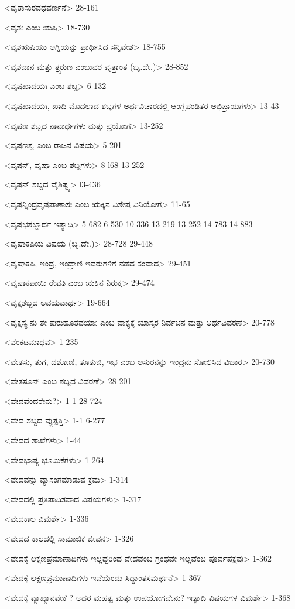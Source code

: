 <ವೃತಾಸುರವಧವರ್ಣನೆ>
28-161

<ವೃಶಃ ಎಂಬ ಋಷಿ>
18-730

<ವೃಶಋಷಿಯು ಅಗ್ನಿಯನ್ನು ಪ್ರಾರ್ಥಿಸಿದ ಸನ್ನಿವೇಶ>
18-755

<ವೃಶಜಾನ ಮತ್ತು ತ್ರ್ಯರುಣ ಎಂಬುವರ ವೃತ್ತಾಂತ (ಬೃ.ದೇ.)>
28-852

<ವೃಷಖಾದಯಃ ಎಂಬ ಶಬ್ದ>
6-132

<ವೃಷಖಾದಯಃ, ಖಾದಿ ಮೊದಲಾದ ಶಬ್ದಗಳ ಅರ್ಥವಿಚಾರದಲ್ಲಿ ಆಂಗ್ಲಪಂಡಿತರ ಅಭಿಪ್ರಾಯಗಳು>
13-43

<ವೃಷಣ ಶಬ್ದದ ನಾನಾರ್ಥಗಳು ಮತ್ತು ಪ್ರಯೋಗ>
13-252

<ವೃಷಣಶ್ವ ಎಂಬ ರಾಜನ ವಿಷಯ>
5-201

<ವೃಷನ್‍, ವೃಷಾ ಎಂಬ ಶಬ್ದಗಳು>
8-l68
13-252

<ವೃಷನ್‍ ಶಬ್ದದ ವೈಶಿಷ್ಟ್ಯ>
l3-436

<ವೃಷನ್ನಿಂದ್ರವೃಷಪಾಣಾಸಃ ಎಂಬ ಋಕ್ಕಿನ ವಿಶೇಷ ವಿನಿಯೋಗ>
11-65

<ವೃಷಭಶಬ್ದಾರ್ಥ ಇತ್ಯಾದಿ>
5-682
6-530 
10-336 
13-219 
13-252
14-783
14-883

<ವೃಷಾಕಪಿಯ ವಿಷಯ (ಬೃ.ದೇ.)>
28-728
29-448

<ವೃಷಾಕಪಿ, ಇಂದ್ರ, ಇಂದ್ರಾಣಿ ಇವರುಗಳಿಗೆ ನಡೆದ ಸಂವಾದ>
29-451

<ವೃಷಾಕಪಾಯಿ ರೇವತಿ ಎಂಬ ಋಕ್ಕಿನ ನಿರುಕ್ತ>
29-474

<ವೃಕ್ಷಶಬ್ದದ ಅವಯವಾರ್ಥ>
19-664

<ವೃಕ್ಷಸ್ಯ ನು ತೇ ಪುರುಹೂತವಯಾಃ ಎಂಬ ವಾಕ್ಯಕ್ಕೆ ಯಾಸ್ಕರ ನಿರ್ವಚನ ಮತ್ತು ಅರ್ಥವಿವರಣೆ>
20-778

<ವೆಂಕಟಮಾಧವ>
1-235

<ವೇತಸು, ತುಗ, ದಶೋಣಿ, ತೂತುಜಿ, ಇಭ ಎಂಬ ಅಸುರನನ್ನು ಇಂದ್ರನು ಸೋಲಿಸಿದ ವಿಚಾರ>
20-730

<ವೇತಸೂನ್‍ ಎಂಬ ಶಬ್ದದ ವಿವರಣೆ>
28-201

<ವೇದವೆಂದರೇನು?>
1-1
28-724

<ವೇದ ಶಬ್ದದ ವ್ಯುತ್ಪತ್ತಿ>
1-1
6-277

<ವೇದದ ಶಾಖೆಗಳು>
1-44

<ವೇದಭಾಷ್ಯ ಭೂಮಿಕೆಗಳು>
1-264

<ವೇದವನ್ನು ವ್ಯಾಸಂಗಮಾಡುವ ಕ್ರಮ>
1-314

<ವೇದದಲ್ಲಿ ಪ್ರತಿಪಾದಿತವಾದ ವಿಷಯಗಳು>
1-317

<ವೇದಕಾಲ ವಿಮರ್ಶೆ>
1-336

<ವೇದದ ಕಾಲದಲ್ಲಿ ಸಾಮಾಜಿಕ ಜೀವನ>
1-326

<ವೇದಕ್ಕೆ ಲಕ್ಷಣಪ್ರಮಾಣಾದಿಗಳು ಇಲ್ಲದ್ದರಿಂದ ವೇದವೆಂಬ ಗ್ರಂಥವೇ ಇಲ್ಲವೆಂಬ ಪೂರ್ವಪಕ್ಷವು>
1-362

<ವೇದಕ್ಕೆ ಲಕ್ಷಣಪ್ರಮಾಣಾದಿಗಳು ಇವೆಯೆಂದು ಸಿದ್ಧಾಂತಸಮರ್ಥನೆ>
1-367

<ವೇದಕ್ಕೆ ವ್ಯಾಖ್ಯಾನವೇಕೆ ? ಅದರ ಮಹತ್ವ ಮತ್ತು ಉಪಯೋಗವೇನು? ಇತ್ಯಾದಿ ವಿಷಯಗಳ ವಿಮರ್ಶೆ>
1-368

